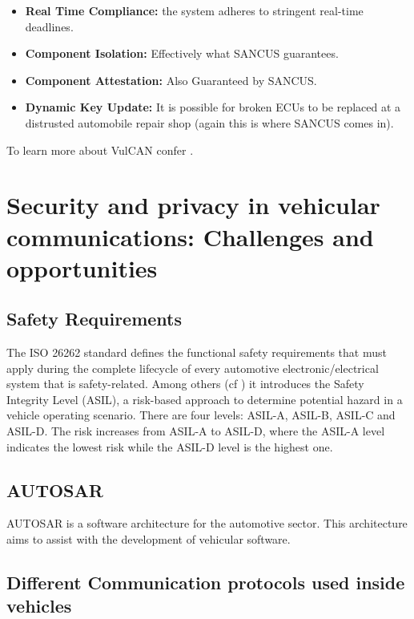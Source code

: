 \documentclass[11pt]{article}
\begin{document}
\begin{itemize}
	\item \textbf{Real Time Compliance:} the system adheres to stringent real-time deadlines.
	\item \textbf{Component Isolation:} Effectively what SANCUS guarantees.
	\item \textbf{Component Attestation:} Also Guaranteed by SANCUS.
	\item \textbf{Dynamic Key Update:} It is possible for broken ECUs to be replaced at a distrusted automobile repair shop (again this is where SANCUS comes in).
\end{itemize}

To learn more about VulCAN confer \cite{VulCAN}.

\section{Security and privacy in vehicular communications: Challenges and opportunities
}

\subsection{Safety Requirements}
The ISO 26262 \cite{ISO-26262-1} standard defines the functional safety requirements that must apply during the complete lifecycle of every automotive electronic/electrical system that is safety-related. Among others (cf \cite{ISO-26262-1}) it introduces the Safety Integrity Level (ASIL), a risk-based approach to determine potential hazard in a vehicle operating scenario. There are four levels: ASIL-A, ASIL-B, ASIL-C and ASIL-D. The risk increases from ASIL-A to ASIL-D, where the ASIL-A level indicates the lowest risk while the ASIL-D level is the highest one.\cite{crispo}

\subsection{AUTOSAR}
AUTOSAR is a software architecture for the automotive sector. This architecture aims to assist with the development of vehicular software. 

\subsection{Different Communication protocols used inside vehicles}
\end{document}
